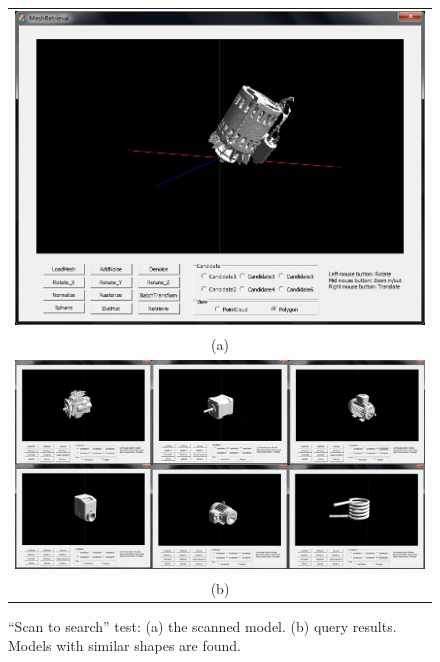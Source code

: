 \begin{figure}
\begin{center}
\begin{tabular}{c}   %
   \includegraphics[height=0.4\columnwidth]{input_engine_scantosearch_test}\\
   (a)\\
   \includegraphics[width=0.95\linewidth]{output_engine_scantosearch_test}  \\
   (b)\\
\end{tabular}
\caption{``Scan to search'' test: (a) the scanned model. (b) query results.  Models with similar shapes are found. } 
  \label{scantosearchtest_engine_UI}
\end{center}
\end{figure}

